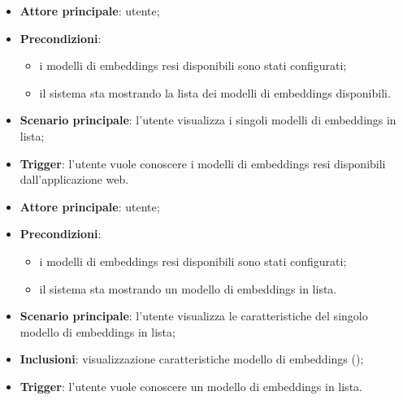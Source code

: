\documentclass[10pt, a4paper]{article}
\begin{document}
    \begin{itemize}
        \item \textbf{Attore principale}: utente;
        \item \textbf{Precondizioni}: 
        \begin{itemize}
            \item i modelli di embeddings resi disponibili sono stati configurati;
            \item il sistema sta mostrando la lista dei modelli di embeddings disponibili.
        \end{itemize}
        \item \textbf{Scenario principale}: l’utente visualizza i singoli modelli di embeddings in lista;
        \item \textbf{Trigger}: l’utente vuole conoscere i modelli di embeddings resi disponibili dall’applicazione web.
    \end{itemize}

    \begin{itemize}
        \item \textbf{Attore principale}: utente;
        \item \textbf{Precondizioni}: 
        \begin{itemize}
            \item i modelli di embeddings resi disponibili sono stati configurati;
            \item il sistema sta mostrando un modello di embeddings in lista.
        \end{itemize}
        \item \textbf{Scenario principale}: l'utente visualizza le caratteristiche del singolo modello di embeddings in lista;
        \item \textbf{Inclusioni}: visualizzazione caratteristiche modello di embeddings ();
        \item \textbf{Trigger}: l’utente vuole conoscere un modello di embeddings in lista.
    \end{itemize}
\end{document}
